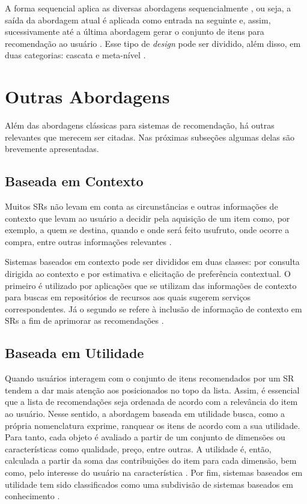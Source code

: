     A forma sequencial aplica as diversas abordagens sequencialmente \cite{Jannach2010}, ou seja, a saída da abordagem atual é aplicada como entrada na seguinte e, assim, sucessivamente até a última abordagem gerar o conjunto de itens para recomendação ao usuário \cite{Burke2002}. Esse tipo de \textit{design} pode ser dividido, além disso, em duas categorias: cascata e meta-nível \cite{Jannach2010}.
    

\section{Outras Abordagens}
    
    Além das abordagens clássicas para sistemas de recomendação, há outras relevantes que merecem ser citadas. Nas próximas subseções algumas delas são brevemente apresentadas.
    
    \subsection{Baseada em Contexto}
    
    Muitos SRs não levam em conta as circunstâncias e outras informações de contexto que levam ao usuário a decidir pela aquisição de um item como, por exemplo, a quem se destina, quando e onde será feito usufruto, onde ocorre a compra, entre outras informações relevantes \cite{Ricci2010, Panniello2012}.
    
    Sistemas baseados em contexto pode ser divididos em duas classes: por consulta dirigida ao contexto e por estimativa e elicitação de preferência contextual. O primeiro é utilizado por aplicações que se utilizam das informações de contexto para buscas em repositórios de recursos aos quais sugerem serviços correspondentes. Já o segundo se refere à inclusão de informação de contexto em SRs a fim de aprimorar as recomendações \cite{Panniello2012}.
    
    \subsection{Baseada em Utilidade}
    
    Quando usuários interagem com o conjunto de itens recomendados por um SR tendem a dar mais atenção aos posicionados no topo da lista. Assim, é essencial que a lista de recomendações seja ordenada de acordo com a relevância do item ao usuário. Nesse sentido, a abordagem baseada em utilidade busca, como a própria nomenclatura exprime, ranquear os itens de acordo com a sua utilidade. Para tanto, cada objeto é avaliado a partir de um conjunto de dimensões ou características como qualidade, preço, entre outras. A utilidade é, então, calculada a partir da soma das contribuições do item para cada dimensão, bem como, pelo interesse do usuário na característica \cite{Jannach2010}. Por fim, sistemas baseados em utilidade tem sido classificados como uma subdivisão de sistemas baseados em conhecimento \cite{Aggarwal2016}.
    
